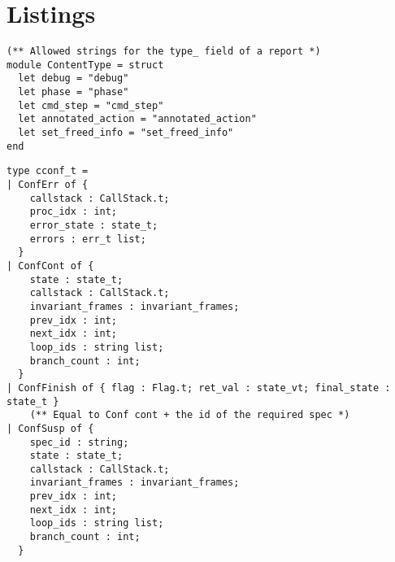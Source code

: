 
\appendix
\chapter{Listings}

\begin{lstlisting}[caption={
  \texttt{loggingConstants.ml}, pre-project
  \label{lst:loggingconstants}}, style=code]
(** Allowed strings for the type_ field of a report *)
module ContentType = struct
  let debug = "debug"
  let phase = "phase"
  let cmd_step = "cmd_step"
  let annotated_action = "annotated_action"
  let set_freed_info = "set_freed_info"
end
\end{lstlisting}

\begin{lstlisting}[caption={
  The \texttt{cconf\_t} type in \texttt{GInterpreter.ml}, pre-project
  \label{lst:cconf-type}}, style=code]
type cconf_t =
| ConfErr of {
    callstack : CallStack.t;
    proc_idx : int;
    error_state : state_t;
    errors : err_t list;
  }
| ConfCont of {
    state : state_t;
    callstack : CallStack.t;
    invariant_frames : invariant_frames;
    prev_idx : int;
    next_idx : int;
    loop_ids : string list;
    branch_count : int;
  }
| ConfFinish of { flag : Flag.t; ret_val : state_vt; final_state : state_t }
    (** Equal to Conf cont + the id of the required spec *)
| ConfSusp of {
    spec_id : string;
    state : state_t;
    callstack : CallStack.t;
    invariant_frames : invariant_frames;
    prev_idx : int;
    next_idx : int;
    loop_ids : string list;
    branch_count : int;
  }
\end{lstlisting}
